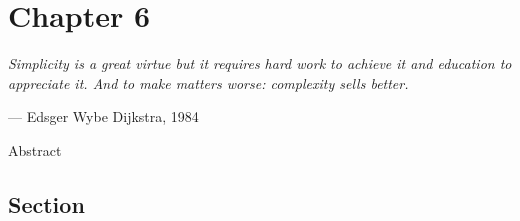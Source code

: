 \setlength{\headheight}{1.2cm}
\renewcommand{\publ}{\flushleft\footnotesize{Based on:\\[0.1cm]
		\textit{``Title''} \\[0.1cm]
}}

\chapter{Chapter 6}
\label{chap:6}
\epigraph{\emph{Simplicity is a great virtue but it requires hard work to achieve it and education to appreciate it. And to make matters worse: complexity sells better.}}{--- Edsger Wybe Dijkstra, 1984}



\begin{Abstract}
Abstract
\end{Abstract}

\section{Section}
\label{sec:2.1}
